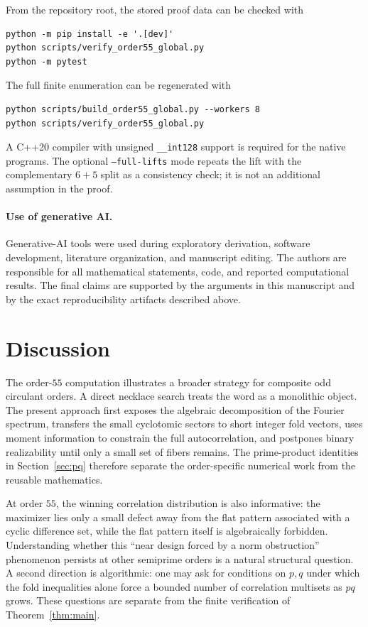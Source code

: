 \documentclass[11pt,a4paper]{article}
\theoremstyle{definition}
\theoremstyle{remark}
\begin{document}
From the repository root, the stored proof data can be checked with
\begin{lstlisting}
python -m pip install -e '.[dev]'
python scripts/verify_order55_global.py
python -m pytest
\end{lstlisting}
The full finite enumeration can be regenerated with
\begin{lstlisting}
python scripts/build_order55_global.py --workers 8
python scripts/verify_order55_global.py
\end{lstlisting}
A C++20 compiler with unsigned \texttt{\_\_int128} support is required for the
native programs.  The optional \texttt{--full-lifts} mode repeats the lift with
the complementary $6+5$ split as a consistency check; it is not an additional
assumption in the proof.

\paragraph{Use of generative AI.}
Generative-AI tools were used during exploratory derivation, software
development, literature organization, and manuscript editing.  The authors
are responsible for all mathematical statements, code, and reported
computational results.  The final claims are supported by the arguments in
this manuscript and by the exact reproducibility artifacts described above.

\section{Discussion}

The order-$55$ computation illustrates a broader strategy for composite odd
circulant orders.  A direct necklace search treats the word as a monolithic
object.  The present approach first exposes the algebraic decomposition of the
Fourier spectrum, transfers the small cyclotomic sectors to short integer fold
vectors, uses moment information to constrain the full autocorrelation, and
postpones binary realizability until only a small set of fibers remains.  The
prime-product identities in Section~\ref{sec:pq} therefore separate the
order-specific numerical work from the reusable mathematics.

At order $55$, the winning correlation distribution is also informative: the
maximizer lies only a small defect away from the flat pattern associated with
a cyclic difference set, while the flat pattern itself is algebraically
forbidden.  Understanding whether this ``near design forced by a norm
obstruction'' phenomenon persists at other semiprime orders is a natural
structural question.  A second direction is algorithmic: one may ask for
conditions on $p,q$ under which the fold inequalities alone force a bounded
number of correlation multisets as $pq$ grows.  These questions are separate
from the finite verification of Theorem~\ref{thm:main}.
\end{document}
